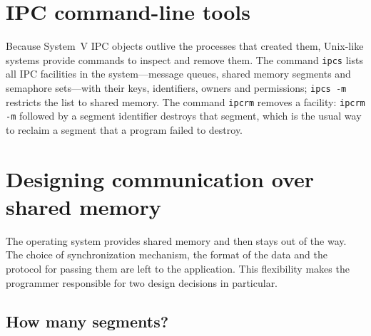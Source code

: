 \documentclass[../main.tex]{subfiles}
\begin{document}
\section{IPC command-line tools}
\label{sec:l09-tools}

Because System~V IPC objects outlive the processes that created them,
Unix-like systems provide commands to inspect and remove them.  The command \texttt{ipcs} lists
all IPC facilities in the system---message queues, shared memory segments
and semaphore sets---with their keys, identifiers, owners and permissions;
\texttt{ipcs -m} restricts the list to shared memory.  The command
\texttt{ipcrm} removes a facility: \texttt{ipcrm -m} followed by a segment
identifier destroys that segment, which is the usual way to reclaim a
segment that a program failed to destroy.

\section{Designing communication over shared memory}
\label{sec:l09-design}

The operating system provides shared memory and then stays out of the
way.  The choice of synchronization mechanism, the format
of the data and the protocol for passing them are left to the application.
This flexibility makes the programmer responsible for two design decisions
in particular.

\subsection{How many segments?}
\end{document}
